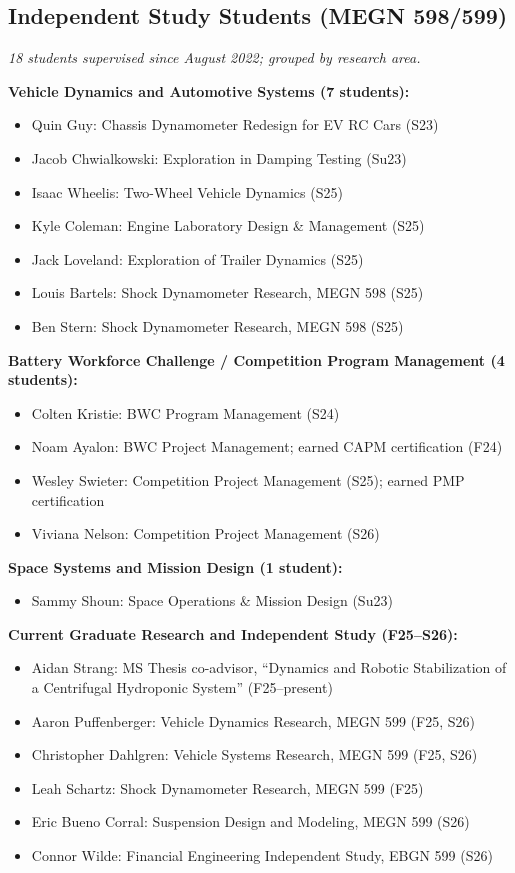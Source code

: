 \documentclass[11pt,letterpaper]{article}
\begin{document}
\subsection{Independent Study Students (MEGN 598/599)}

\noindent\textit{18 students supervised since August 2022; grouped by research area.}

\medskip
\noindent\textbf{Vehicle Dynamics and Automotive Systems (7 students):}
\begin{itemize}[noitemsep]
  \item Quin Guy: Chassis Dynamometer Redesign for EV RC Cars (S23)
  \item Jacob Chwialkowski: Exploration in Damping Testing (Su23)
  \item Isaac Wheelis: Two-Wheel Vehicle Dynamics (S25)
  \item Kyle Coleman: Engine Laboratory Design \& Management (S25)
  \item Jack Loveland: Exploration of Trailer Dynamics (S25)
  \item Louis Bartels: Shock Dynamometer Research, MEGN 598 (S25)
  \item Ben Stern: Shock Dynamometer Research, MEGN 598 (S25)
\end{itemize}

\medskip
\noindent\textbf{Battery Workforce Challenge / Competition Program Management (4 students):}
\begin{itemize}[noitemsep]
  \item Colten Kristie: BWC Program Management (S24)
  \item Noam Ayalon: BWC Project Management; earned CAPM certification (F24)
  \item Wesley Swieter: Competition Project Management (S25); earned PMP certification
  \item Viviana Nelson: Competition Project Management (S26)
\end{itemize}

\medskip
\noindent\textbf{Space Systems and Mission Design (1 student):}
\begin{itemize}[noitemsep]
  \item Sammy Shoun: Space Operations \& Mission Design (Su23)
\end{itemize}

\medskip
\noindent\textbf{Current Graduate Research and Independent Study (F25--S26):}
\begin{itemize}[noitemsep]
  \item Aidan Strang: MS Thesis co-advisor, ``Dynamics and Robotic Stabilization of
        a Centrifugal Hydroponic System'' (F25--present)
  \item Aaron Puffenberger: Vehicle Dynamics Research, MEGN 599 (F25, S26)
  \item Christopher Dahlgren: Vehicle Systems Research, MEGN 599 (F25, S26)
  \item Leah Schartz: Shock Dynamometer Research, MEGN 599 (F25)
  \item Eric Bueno Corral: Suspension Design and Modeling, MEGN 599 (S26)
  \item Connor Wilde: Financial Engineering Independent Study, EBGN 599 (S26)
\end{itemize}
\end{document}
